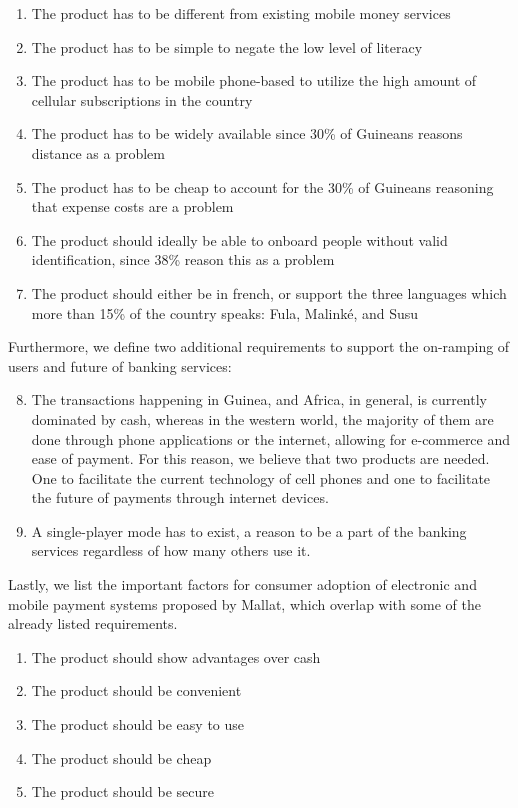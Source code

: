\documentclass[11pt, a4paper]{article}
\begin{document}
\begin{enumerate}
  \item The product has to be different from existing mobile money services
  \item The product has to be simple to negate the low level of literacy
  \item The product has to be mobile phone-based to utilize the high amount of cellular subscriptions in the country
  \item The product has to be widely available since 30\% of Guineans reasons distance as a problem
  \item The product has to be cheap to account for the 30\% of Guineans reasoning that expense costs are a problem
  \item The product should ideally be able to onboard people without valid identification, since 38\% reason this as a problem
  \item The product should either be in french, or support the three languages which more than 15\% of the country speaks: Fula, Malinké, and Susu
\end{enumerate}

Furthermore, we define two additional requirements to support the on-ramping of users and future of banking services:

\begin{enumerate}
  \setcounter{enumi}{7}
  \item The transactions happening in Guinea, and Africa, in general, is currently dominated by cash, whereas in the western world, the majority of them are done through phone applications or the internet, allowing for e-commerce and ease of payment. For this reason, we believe that two products are needed. One to facilitate the current technology of cell phones and one to facilitate the future of payments through internet devices.
  \item A single-player mode has to exist, a reason to be a part of the banking services regardless of how many others use it.
\end{enumerate}

Lastly, we list the important factors for consumer adoption of electronic and mobile payment systems proposed by Mallat\cite{Mallat}, which overlap with some of the already listed requirements.
\begin{enumerate}
  \item The product should show advantages over cash
  \item The product should be convenient
  \item The product should be easy to use
  \item The product should be cheap
  \item The product should be secure
\end{enumerate}
\end{document}
